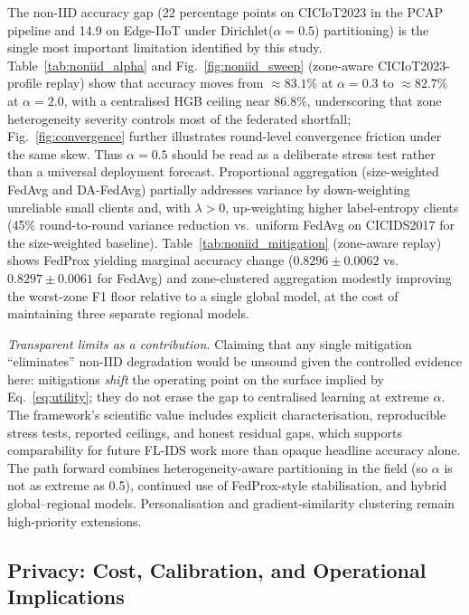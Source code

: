 \documentclass[sensors,article,submit,pdftex,moreauthors]{Definitions/mdpi}
\begin{document}
The non-IID accuracy gap (22 percentage points on CICIoT2023 in the PCAP pipeline and 14.9 on Edge-IIoT under Dirichlet($\alpha{=}0.5$) partitioning) is the single most important limitation identified by this study. Table~\ref{tab:noniid_alpha} and Fig.~\ref{fig:noniid_sweep} (zone-aware CICIoT2023-profile replay) show that accuracy moves from ${\approx}83.1\%$ at $\alpha{=}0.3$ to ${\approx}82.7\%$ at $\alpha{=}2.0$, with a centralised HGB ceiling near $86.8\%$, underscoring that zone heterogeneity severity controls most of the federated shortfall; Fig.~\ref{fig:convergence} further illustrates round-level convergence friction under the same skew. Thus $\alpha{=}0.5$ should be read as a deliberate stress test rather than a universal deployment forecast. Proportional aggregation (size-weighted FedAvg and DA-FedAvg) partially addresses variance by down-weighting unreliable small clients and, with $\lambda{>}0$, up-weighting higher label-entropy clients (45\% round-to-round variance reduction vs.\ uniform FedAvg on CICIDS2017 for the size-weighted baseline). Table~\ref{tab:noniid_mitigation} (zone-aware replay) shows FedProx yielding marginal accuracy change ($0.8296{\pm}0.0062$ vs.\ $0.8297{\pm}0.0061$ for FedAvg) and zone-clustered aggregation modestly improving the worst-zone F1 floor relative to a single global model, at the cost of maintaining three separate regional models.

\noindent\textit{Transparent limits as a contribution.} Claiming that any single mitigation ``eliminates'' non-IID degradation would be unsound given the controlled evidence here: mitigations \textit{shift} the operating point on the surface implied by Eq.~\eqref{eq:utility}; they do not erase the gap to centralised learning at extreme $\alpha$. The framework's scientific value includes explicit characterisation, reproducible stress tests, reported ceilings, and honest residual gaps, which supports comparability for future FL-IDS work more than opaque headline accuracy alone. The path forward combines heterogeneity-aware partitioning in the field (so $\alpha$ is not as extreme as 0.5), continued use of FedProx-style stabilisation, and hybrid global--regional models. Personalisation and gradient-similarity clustering remain high-priority extensions.

\subsection{Privacy: Cost, Calibration, and Operational Implications}
\end{document}
